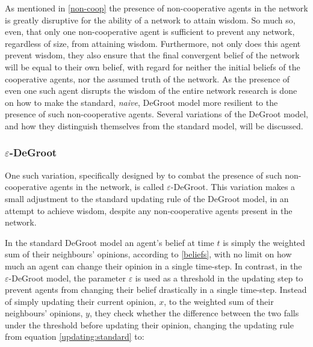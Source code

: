 \documentclass{article}
\begin{document}
As mentioned in \ref{non-coop} the presence of non-cooperative agents in the network is greatly disruptive for the ability of a network to attain wisdom. So much so, even, that only one non-cooperative agent is sufficient to prevent any network, regardless of size, from attaining wisdom. Furthermore, not only does this agent prevent wisdom, they also ensure that the final convergent belief of the network will be equal to their own belief, with regard for neither the initial beliefs of the cooperative agents, nor the assumed truth of the network. As the presence of even one such agent disrupts the wisdom of the entire network research is done on how to make the standard, \emph{naive}, DeGroot model more resilient to the presence of such non-cooperative agents. Several variations of the DeGroot model, and how they distinguish themselves from the standard model, will be discussed.

\subsubsection{$\varepsilon$-DeGroot}

One such variation, specifically designed by \cite{amir2021robust} to combat the presence of such non-cooperative agents in the network, is called $\varepsilon$-DeGroot. This variation makes a small adjustment to the standard updating rule of the DeGroot model, in an attempt to achieve wisdom, despite any non-cooperative agents present in the network.

In the standard DeGroot model an agent's belief at time $t$ is simply the weighted sum of their neighbours' opinions, according to \ref{beliefs}, with no limit on how much an agent can change their opinion in a single time-step. In contrast, in the $\varepsilon$-DeGroot model, the parameter $\varepsilon$ is used as a threshold in the updating step to prevent agents from changing their belief drastically in a single time-step.
Instead of simply updating their current opinion, $x$, to the weighted sum of their neighbours' opinions, $y$, they check whether the difference between the two falls under the threshold before updating their opinion, changing the updating rule from equation \ref{updating:standard} to:
\end{document}
